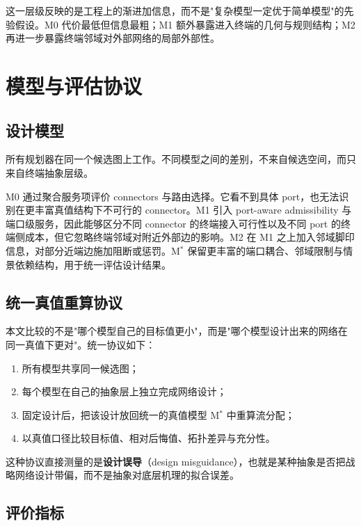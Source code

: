 \documentclass[review,authoryear]{elsarticle}
\begin{document}
这一层级反映的是工程上的渐进加信息，而不是"复杂模型一定优于简单模型"的先验假设。M0 代价最低但信息最粗；M1 额外暴露进入终端的几何与规则结构；M2 再进一步暴露终端邻域对外部网络的局部外部性。


\section{模型与评估协议}
\label{sec:models}

\subsection{设计模型}
\label{sec:models:design}

所有规划器在同一个候选图上工作。不同模型之间的差别，不来自候选空间，而只来自终端抽象层级。

M0 通过聚合服务项评价 connectors 与路由选择。它看不到具体 port，也无法识别在更丰富真值结构下不可行的 connector。M1 引入 port-aware admissibility 与端口级服务，因此能够区分不同 connector 的终端接入可行性以及不同 port 的终端侧成本，但它忽略终端邻域对附近外部边的影响。M2 在 M1 之上加入邻域脚印信息，对部分近端边施加阻断或惩罚。M$^*$ 保留更丰富的端口耦合、邻域限制与情景依赖结构，用于统一评估设计结果。

\subsection{统一真值重算协议}
\label{sec:models:evaluation}

本文比较的不是"哪个模型自己的目标值更小"，而是"哪个模型设计出来的网络在同一真值下更对"。统一协议如下：
\begin{enumerate}
  \item 所有模型共享同一候选图；
  \item 每个模型在自己的抽象层上独立完成网络设计；
  \item 固定设计后，把该设计放回统一的真值模型 M$^*$ 中重算流分配；
  \item 以真值口径比较目标值、相对后悔值、拓扑差异与充分性。
\end{enumerate}

这种协议直接测量的是\textbf{设计误导}（design misguidance），也就是某种抽象是否把战略网络设计带偏，而不是抽象对底层机理的拟合误差。

\subsection{评价指标}
\label{sec:models:metrics}
\end{document}

